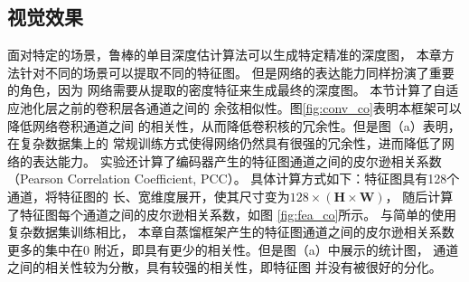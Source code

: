 \subsection{视觉效果}

面对特定的场景，鲁棒的单目深度估计算法可以生成特定精准的深度图，
本章方法针对不同的场景可以提取不同的特征图。
但是网络的表达能力同样扮演了重要的角色，因为
网络需要从提取的密度特征来生成最终的深度图。
本节计算了自适应池化层之前的卷积层各通道之间的
余弦相似性。图\ref{fig:conv_co}表明本框架可以降低网络卷积通道之间
的相关性，从而降低卷积核的冗余性。但是图（a）表明，在复杂数据集上的
常规训练方式使得网络仍然具有很强的冗余性，进而降低了网络的表达能力。
实验还计算了编码器产生的特征图通道之间的皮尔逊相关系数
（Pearson Correlation Coefficient, PCC）。
具体计算方式如下：特征图具有128个通道，将特征图的
长、宽维度展开，使其尺寸变为$128\times\mathbf{(H\times W)}$，
随后计算了特征图每个通道之间的皮尔逊相关系数，如图
\ref{fig:fea_co}所示。 与简单的使用复杂数据集训练相比，
本章自蒸馏框架产生的特征图通道之间的皮尔逊相关系数更多的集中在0
附近，即具有更少的相关性。但是图（a）中展示的统计图，
通道之间的相关性较为分散，具有较强的相关性，即特征图
并没有被很好的分化。

